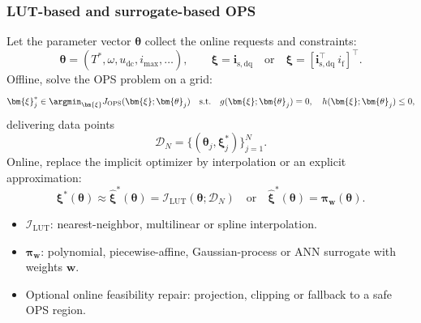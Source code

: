 \begin{frame}
    \frametitle{LUT-based and surrogate-based OPS}
    Let the parameter vector $\bm{\theta}$ collect the online requests and constraints:
    \[
        \bm{\theta}=(T^*,\omega,u_{\mathrm{dc}},i_{\max},\ldots),
        \qquad
        \bm{\xi}=\bm{i}_{\mathrm{s,dq}}\quad\text{or}\quad
        \bm{\xi}=[\bm{i}_{\mathrm{s,dq}}^\top\ i_{\mathrm{f}}]^\top .
    \]\pause%
    Offline, solve the OPS problem on a grid:
    \[
        \bm{\xi}_j^*\in
        \argmin_{\bm{\xi}} J_{\mathrm{OPS}}(\bm{\xi};\bm{\theta}_j)
        \quad\text{s.t.}\quad
        g(\bm{\xi};\bm{\theta}_j)=0,
        \quad
        h(\bm{\xi};\bm{\theta}_j)\le 0,
    \]\pause%
    delivering data points
    \[
        \mathcal D_N=\{(\bm{\theta}_j,\bm{\xi}_j^*)\}_{j=1}^{N}.
    \]\pause%
    Online, replace the implicit optimizer by interpolation or an explicit approximation:
    \[
        \bm{\xi}^*(\bm{\theta})\approx \widehat{\bm{\xi}}^*(\bm{\theta})
        =\mathcal I_{\mathrm{LUT}}(\bm{\theta};\mathcal D_N)
        \quad\text{or}\quad
        \widehat{\bm{\xi}}^*(\bm{\theta})=\bm{\pi}_{\bm{w}}(\bm{\theta}).
    \]
    \begin{itemize}
        \item $\mathcal I_{\mathrm{LUT}}$: nearest-neighbor, multilinear or spline interpolation.\pause%
        \item $\bm{\pi}_{\bm{w}}$: polynomial, piecewise-affine, Gaussian-process or ANN surrogate with weights $\bm{w}$.\pause%
        \item Optional online feasibility repair: projection, clipping or fallback to a safe OPS region.
    \end{itemize}
\end{frame}

